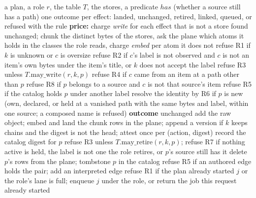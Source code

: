 \documentclass[11pt]{article}
\theoremstyle{plain}
\theoremstyle{definition}
\theoremstyle{remark}
\newcommand{\code}[1]{\texttt{#1}}
\begin{document}
\begin{algorithm}[t]
\caption{Landing a plan, effect by effect, the key last (\code{core/ingest/writer.py}).}
\label{alg:land}
\footnotesize
\begin{algorithmic}[1]
\Require a plan, a role $r$, the table $T$, the stores, a predicate $\mathit{has}$ (whether a source still has a path)
\Ensure one outcome per effect: landed, unchanged, retired, linked, queued, or refused with the rule
\State \textbf{price:} charge \emph{write} for each effect that is not a store found unchanged; chunk the distinct bytes of the stores, ask the plane which atoms it holds in the classes the role reads, charge \emph{embed} per atom it does not
    \State refuse R1 if $k$ is unknown or $c$ is oversize
    \State refuse R2 if $c$'s label is not observed and $c$ is not an item's own bytes under the item's title, or $k$ does not accept the label
    \State refuse R3 unless $T.\mathrm{may\_write}(r, k, p)$ 
    \State refuse R4 if $c$ came from an item at a path other than $p$
    \State refuse R8 if $p$ belongs to a source and $c$ is not that source's item
    \State refuse R5 if the catalog holds $p$ under another label
    \State resolve the identity by R6 if $p$ is new (own, declared, or held at a vanished path with the same bytes and label, within one source; a composed name is refused)
     \textbf{outcome} unchanged
    \EndIf
    \State add the raw object; embed and land the chunk rows in the plane; append a version if $k$ keeps chains and the digest is not the head; attest once per (action, digest)
    \State record the catalog digest for $p$ 
    \State refuse R3 unless $T.\mathrm{may\_retire}(r, k, p)$; refuse R7 if nothing active is held, the label is not one the role retires, or $p$'s source still has it
    \State delete $p$'s rows from the plane; tombstone $p$ in the catalog 
   refuse R5 if an authored edge holds the pair; add an interpreted edge
   refuse R1 if the plan already started $j$ or the role's lane is full; enqueue $j$ under the role, or return the job this request already started
  \EndIf
\EndFor
\end{algorithmic}
\end{algorithm}
\end{document}
